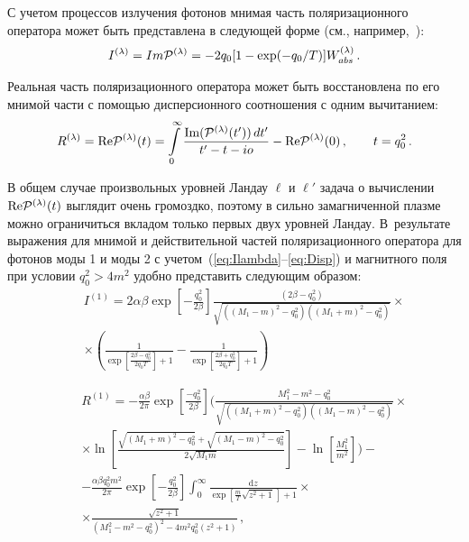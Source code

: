 \documentclass[14pt, russian]{article}
\def\beq{\begin{eqnarray}}
\def\eeq{\end{eqnarray}}
\newcommand{\dd}{\mathrm{d}} %
\begin{document}
С учетом процессов излучения фотонов мнимая часть поляризационного оператора может быть представлена в следующей форме (см., например,~\cite{Shabad:1988, Rumyantsev:2017,Weldon:1983}): 
\begin{eqnarray}\label{eq:Ilambda}
I^{(\lambda)}=Im {\cal P}^{(\lambda)} =  -2 q_0 [1-\exp (-q_0/T)] W^{(\lambda)}_{abs} \, . 
\label{eq:ImP}
\end{eqnarray}

Реальная часть поляризационного оператора может быть восстановлена по его мнимой части с помощью дисперсионного соотношения с одним вычитанием:
%
\beq 
R^{(\lambda)}=\textrm{Re}{\cal P}^{(\lambda)} (t) = \int \limits_0^\infty \frac{\textrm{Im}({\cal P}^{(\lambda)} (t'))\,dt'}{t'-t-i o} - \textrm{Re}{\cal P}^{(\lambda)} (0)\,, \qquad  t = q^2_0 \, .
\label{eq:Disp}
\eeq

В общем случае произвольных уровней Ландау $\ell$ и $\ell'$ задача о вычислении $\textrm{Re} {\cal P}^{(\lambda)}(t)$ выглядит очень громоздко, поэтому в сильно замагниченной плазме можно ограничиться вкладом только первых двух уровней Ландау. В~результате выражения для мнимой и действительной частей поляризационного оператора для фотонов моды 1 и моды 2 с учетом~(\ref{eq:Ilambda}--\ref{eq:Disp}) и магнитного поля при условии $q_0^2>4m^2$ удобно представить следующим образом:
\begin{eqnarray}
	\nonumber
		&&I^{(1)}=2\alpha\beta\exp \left[-\frac{q_0^2}{2\beta }\right]\frac{\left(2\beta -q_0^2\right)}{ \sqrt{\left((M_1-m)^2-q_0^2\right) \left((M_1+m)^2-q_0^2\right)}}\times
	\\
	&&\times\left(\frac{1}{\exp\left[\frac{2\beta -q_0^2}{2 q_0 T}\right]+1}-\frac{1}{\exp\left[\frac{2\beta +q_0^2}{2 q_0 T}\right]+1}\right)
\end{eqnarray}

\begin{eqnarray}
		\nonumber
		&&R^{(1)}= -\frac{\alpha \beta}{2\pi}\exp\left[\frac{-q_0^2}{2\beta}\right]\bigg(\frac{M_1^2-m^2-q_0^2}{\sqrt{((M_1+m)^2-q_0^2)((M_1-m)^2-q_0^2)}}
		\times
		\\
		\nonumber
		&&\times
		\ln\left[\frac{\sqrt{(M_1+m)^2-q_0^2}+\sqrt{(M_1-m)^2-q_0^2}}{2\sqrt{M_1 m}}\right]-\ln\left[\frac{M_1^2}{m^2}\right]\bigg)
		-
		\\
		\nonumber
		&&-\frac{\alpha \beta q_0^2 m^2}{2\pi} \exp\left[-\frac{q_0^2}{2\beta}\right]\int_{0}^{\infty}\frac{\dd z}{\exp \left[\frac{m}{T}\sqrt{z^2+1}\,\right]+1}\times
		\\
		&&\times\frac{\sqrt{z^2+1}}{ \left(M_1^2-m^2-q_0^2\right)^2-4m^2q_0^2 \left(z^2+1\right)}\, ,
\end{eqnarray}
\end{document}
